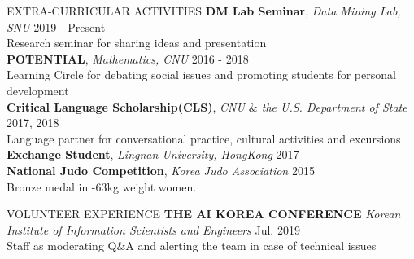\documentclass[10pt]{resume} %
\begin{document}
\begin{rSection}{EXTRA-CURRICULAR ACTIVITIES}
%
{\bf DM Lab Seminar}, \textit{Data Mining Lab, SNU} \hfill 2019 - Present\\
Research seminar for sharing ideas and presentation\\
%
{\bf POTENTIAL}, \textit{Mathematics, CNU} \hfill 2016 - 2018\\
Learning Circle for debating social issues and promoting students for personal development\\
%
{\bf Critical Language Scholarship(CLS)}, \textit{CNU $\&$ the U.S. Department of State} \hfill 2017, 2018\\
Language partner for conversational practice, cultural activities and excursions \\
%
{\bf Exchange Student}, \textit{Lingnan University, HongKong} \hfill 2017\\
%
{\bf National Judo Competition}, \textit{Korea Judo Association} \hfill 2015\\
Bronze medal in -63kg weight women.
\end{rSection}


\begin{rSection}{VOLUNTEER EXPERIENCE}
%
{\bf THE AI KOREA CONFERENCE} \textit{Korean Institute of Information Scientists and Engineers} \hfill Jul. 2019 \\
Staff as moderating Q$\&$A and alerting the team in case of technical issues
\end{rSection}
\end{document}
